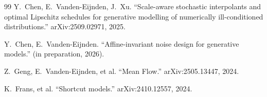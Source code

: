 \documentclass[11pt]{article}
\begin{document}

\begin{thebibliography}{99}
Y.~Chen, E.~Vanden-Eijnden, J.~Xu.
``Scale-aware stochastic interpolants and optimal Lipschitz schedules
for generative modelling of numerically ill-conditioned distributions.''
arXiv:2509.02971, 2025.

Y.~Chen, E.~Vanden-Eijnden.
``Affine-invariant noise design for generative models.'' (in preparation, 2026).

Z.~Geng, E.~Vanden-Eijnden, et al.
``Mean Flow.'' arXiv:2505.13447, 2024.

K.~Frans, et al.
``Shortcut models.'' arXiv:2410.12557, 2024.
\end{thebibliography}
\end{document}

